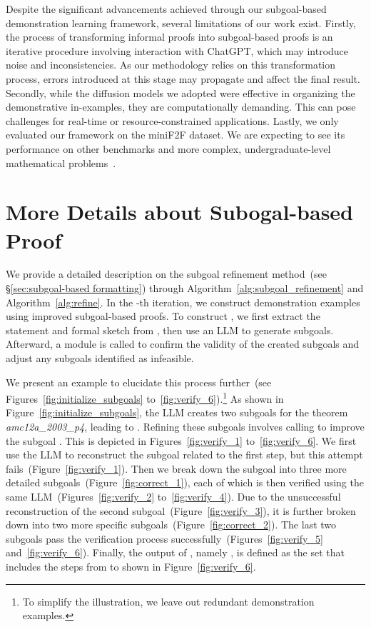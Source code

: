 \documentclass{article}
\begin{document}
Despite the significant advancements achieved through our subgoal-based demonstration learning framework, several limitations of our work exist. Firstly, the process of transforming informal proofs into subgoal-based proofs is an iterative procedure involving interaction with ChatGPT, which may introduce noise and inconsistencies. As our methodology relies on this transformation process, errors introduced at this stage may propagate and affect the final result.
Secondly, while the diffusion models we adopted were effective in organizing the demonstrative in-examples, they are computationally demanding. This can pose challenges for real-time or resource-constrained applications.
Lastly, we only evaluated our framework on the miniF2F dataset. We are expecting to see its performance on other benchmarks and more complex, undergraduate-level mathematical problems~\cite{azerbayev2023proofnet}. 















\clearpage
\appendix
\section{More Details about Subogal-based Proof}
\label{sec:appendix_subgoal}

We provide a detailed description on the subgoal refinement method~(see §\ref{sec:subgoal-based formatting}) through Algorithm~\ref{alg:subgoal_refinement} and Algorithm~\ref{alg:refine}. In the -th iteration, we construct demonstration examples  using improved subgoal-based proofs. To construct , we first extract the statement and formal sketch from , then use an LLM to generate subgoals. Afterward, a  module is called to confirm the validity of the created subgoals and adjust any subgoals identified as infeasible.

We present an example to elucidate this process further~(see Figures~\ref{fig:initialize_subgoals} to~\ref{fig:verify_6}).\footnote{To simplify the illustration, we leave out redundant demonstration examples.} As shown in Figure~\ref{fig:initialize_subgoals}, the LLM creates two subgoals for the theorem \emph{amc12a\_2003\_p4}, leading to .  Refining these subgoals involves calling  to improve the subgoal . This is depicted in Figures~\ref{fig:verify_1} to~\ref{fig:verify_6}.  We first use the LLM to reconstruct the subgoal related to the first step, but this attempt fails~(Figure~\ref{fig:verify_1}). Then we break down the subgoal  into three more detailed subgoals~(Figure~\ref{fig:correct_1}), each of which is then verified using the same LLM~(Figures~\ref{fig:verify_2} to~\ref{fig:verify_4}). Due to the unsuccessful reconstruction of the second subgoal~(Figure~\ref{fig:verify_3}), it is further broken down into two more specific subgoals~(Figure~\ref{fig:correct_2}). The last two subgoals pass the verification process successfully~(Figures~\ref{fig:verify_5} and~\ref{fig:verify_6}). Finally, the output of , namely , is defined as the set that includes the steps from  to  shown in Figure~\ref{fig:verify_6}.
\end{document}
